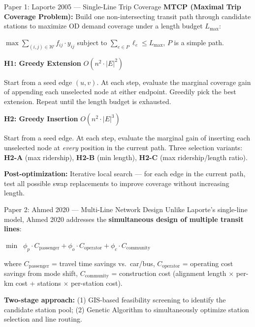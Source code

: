 \documentclass[final]{beamer}
\begin{document}
\begin{frame}[t]
\begin{minipage}[t]{0.48\paperwidth}
\begin{block}{\Large Paper 1: Laporte 2005 --- Single-Line Trip Coverage}
\normalsize
\textbf{MTCP (Maximal Trip Coverage Problem):} Build one non-intersecting transit path through candidate stations to maximize OD demand coverage under a length budget $L_{\max}$:

$\displaystyle\max \sum_{(i,j) \in \mathcal{W}} f_{ij} \cdot y_{ij}$ \quad subject to $\sum_{e \in P} \ell_e \leq L_{\max}$, $P$ is a simple path.

\textbf{H1: Greedy Extension} \hfill {\small$O(n^2 \cdot |E|^2)$}

Start from a seed edge $(u,v)$. At each step, evaluate the marginal coverage gain of appending each unselected node at either endpoint. Greedily pick the best extension. Repeat until the length budget is exhausted.

\textbf{H2: Greedy Insertion} \hfill {\small$O(n^2 \cdot |E|^3)$}

Start from a seed edge. At each step, evaluate the marginal gain of inserting each unselected node at \emph{every} position in the current path. Three selection variants: \textbf{H2-A} (max ridership), \textbf{H2-B} (min length), \textbf{H2-C} (max ridership/length ratio).

\textbf{Post-optimization:} Iterative local search --- for each edge in the current path, test all possible swap replacements to improve coverage without increasing length.
\end{block}

\vspace{0.15cm}

\begin{block}{\Large Paper 2: Ahmed 2020 --- Multi-Line Network Design}
\normalsize
Unlike Laporte's single-line model, Ahmed 2020 addresses the \textbf{simultaneous design of multiple transit lines}:

$\displaystyle\min \;\; \phi_p \cdot C_{\mathrm{passenger}} + \phi_o \cdot C_{\mathrm{operator}} + \phi_c \cdot C_{\mathrm{community}}$

where $C_{\mathrm{passenger}}$ = travel time savings vs.\ car/bus, $C_{\mathrm{operator}}$ = operating cost savings from mode shift, $C_{\mathrm{community}}$ = construction cost (alignment length $\times$ per-km cost + stations $\times$ per-station cost).

\textbf{Two-stage approach:} (1) GIS-based feasibility screening to identify the candidate station pool; (2) Genetic Algorithm to simultaneously optimize station selection and line routing.


\end{block}
\end{minipage}
\end{frame}
\end{document}
